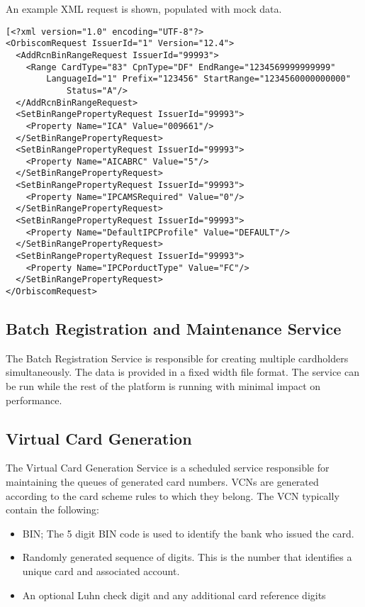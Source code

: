 \documentclass[a4paper, 11pt, titlepage]{article}
\begin{document}
An example XML request is shown, populated with mock data. 
\begin{verbatim} 
[<?xml version="1.0" encoding="UTF-8"?> 
<OrbiscomRequest IssuerId="1" Version="12.4"> 
  <AddRcnBinRangeRequest IssuerId="99993"> 
    <Range CardType="83" CpnType="DF" EndRange="1234569999999999" 
        LanguageId="1" Prefix="123456" StartRange="1234560000000000" 
            Status="A"/> 
  </AddRcnBinRangeRequest> 
  <SetBinRangePropertyRequest IssuerId="99993"> 
    <Property Name="ICA" Value="009661"/> 
  </SetBinRangePropertyRequest> 
  <SetBinRangePropertyRequest IssuerId="99993"> 
    <Property Name="AICABRC" Value="5"/> 
  </SetBinRangePropertyRequest> 
  <SetBinRangePropertyRequest IssuerId="99993"> 
    <Property Name="IPCAMSRequired" Value="0"/> 
  </SetBinRangePropertyRequest> 
  <SetBinRangePropertyRequest IssuerId="99993"> 
    <Property Name="DefaultIPCProfile" Value="DEFAULT"/> 
  </SetBinRangePropertyRequest> 
  <SetBinRangePropertyRequest IssuerId="99993"> 
    <Property Name="IPCPorductType" Value="FC"/> 
  </SetBinRangePropertyRequest> 
</OrbiscomRequest> 
\end{verbatim} 
 
 
\subsection{Batch Registration and Maintenance Service} 
The Batch Registration Service is responsible for creating multiple cardholders simultaneously. The data is provided in a fixed width file format. The service can be run while the rest of the platform is running with minimal impact on performance.
 

\subsection{Virtual Card Generation} 
The Virtual Card Generation Service is a scheduled service responsible for maintaining the queues of generated card numbers. VCNs are generated according to the card scheme rules to which they belong. The VCN typically contain the following:
\begin{itemize}
\item \label{bin_range} BIN; The 5 digit BIN code is used to identify the bank who issued the card.
\item Randomly generated sequence of digits. This is the number that identifies a unique card and associated account.
\item An optional Luhn check digit and any additional card reference digits
\end{itemize}
\end{document}
